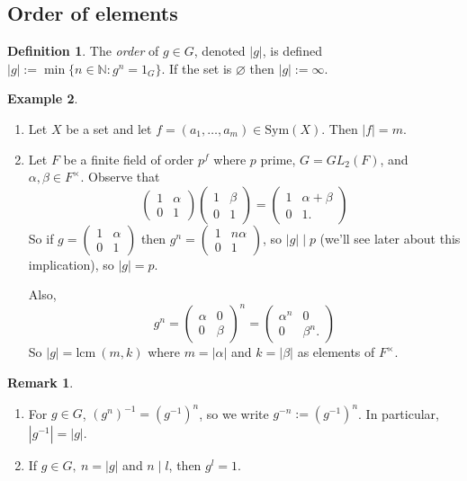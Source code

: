 \documentclass[a4paper]{article}
\newcommand{\Sym}{\text{Sym}}
\newcommand{\lcm}{\text{lcm}\ }
\theoremstyle{definition}
\newtheorem{defn}{Definition}[subsection]
\newtheorem{example}[defn]{Example}
\newtheorem*{remark}{Remark}
\begin{document}
\subsection{Order of elements}
\begin{defn}
The \textit{order} of $g\in G$, denoted $|g|$, is defined $|g|:=\min \{n\in\mathbb N:g^n= 1_G\}$. If the set is $\varnothing$ then $|g|:=\infty$.
\end{defn}
\begin{example}
\begin{enumerate}
\item Let $X$ be a set and let $f=(a_1,\ldots,a_m)\in\Sym(X)$. Then $|f|=m$.
\item Let $F$ be a finite field of order $p^f$ where $p$ prime, $G=GL_2(F)$, and $\alpha,\beta\in F^{\times}$. Observe that
\[
\begin{pmatrix}
1 & \alpha \\ 0 & 1
\end{pmatrix}
\begin{pmatrix}
1 & \beta \\ 0 & 1
\end{pmatrix}=
\begin{pmatrix}
1 & \alpha+\beta \\ 0 & 1.
\end{pmatrix}
\]
So if $g=\begin{pmatrix}
1 & \alpha \\ 0 & 1
\end{pmatrix}$ then $g^n=\begin{pmatrix}
1 & n\alpha \\ 0 & 1
\end{pmatrix}$, so $|g|\mid p$ (we'll see later about this implication), so $|g|=p$.

Also,
\[
g^n=\begin{pmatrix}
\alpha & 0 \\ 0 & \beta
\end{pmatrix}^n=
\begin{pmatrix}
\alpha^n & 0 \\ 0 & \beta^n .
\end{pmatrix}
\]
So $|g|=\lcm (m,k)$ where $m=|\alpha|$ and $k=|\beta|$ as elements of $F^\times$.
\end{enumerate}
\end{example}
\begin{remark}
\begin{enumerate}
\item For $g\in G$, $(g^n)^{-1}=\left(g^{-1}\right)^n$, so we write $g^{-n}:=\left(g^{-1}\right)^n$. In particular, $\left|g^{-1}\right|=|g|$.
\item If $g\in G,\ n=|g|$ and $n\mid l$, then $g^l=1$.
\end{enumerate}
\end{remark}
\end{document}
